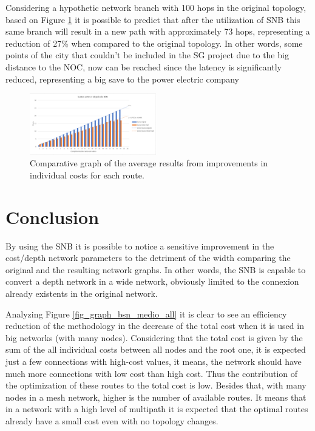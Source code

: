 \documentclass[conference]{IEEEtran}
\begin{document}
Considering a hypothetic network branch with 100 hops in the original topology, based on Figure \ref{fig_graph_melhoria_por_custo} it is possible to predict that after the utilization of SNB this same branch will result in a new path with approximately 73 hops, representing a reduction of 27\% when compared to the original topology. In other words, some points of the city that couldn’t be included in the SG project due to the big distance to the NOC, now can be reached since the latency is significantly reduced, representing a big save to the power electric company

\begin{figure} [ht]%
	\centering
	\includegraphics[width=0.49\textwidth]{./figuras/Melhoria-por-custo.png} %
	\caption{Comparative graph of the average results from improvements in individual costs for each route.}
	\label{fig_graph_melhoria_por_custo}
\end{figure}


\section{Conclusion}
By using the SNB it is possible to notice a sensitive improvement in the cost/depth network parameters to the detriment of the width comparing the original and the resulting network graphs. In other words, the SNB is capable to convert a depth network in a wide network, obviously limited to the connexion already existents in the original network.

Analyzing Figure \ref{fig_graph_bsn_medio_all} it is clear to see an efficiency reduction of the methodology in the decrease of the total cost when it is used in big networks (with many nodes). Considering that the total cost is given by the sum of the all individual costs between all nodes and the root one, it is expected just a few connections with high-cost values, it means, the network should have much more connections with low cost than high cost. Thus the contribution of the optimization of these routes to the total cost is low. Besides that, with many nodes in a mesh network, higher is the number of available routes. It means that in a network with a high level of multipath it is expected that the optimal routes already have a small cost even with no topology changes.
\end{document}
